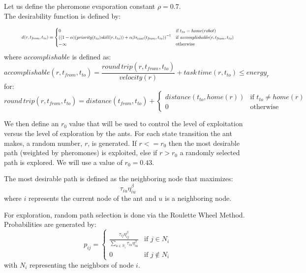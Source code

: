 \documentclass[a4paper]{article}
\begin{document}
Let us define the pheromone evaporation constant $\rho=0.7$.\\
The desirability function is defined by:

\begin{equation*}
\resizebox{0.9\textwidth}{!}{$
\mathit{d}(r, t_\mathit{from}, t_\mathit{to}) = \begin{cases}
  0 & \text{if } t_\mathit{to} = \mathit{home}(robot) \\
  \left(
  (1 - \alpha)
    (\mathit{priority}(t_\mathit{to}) \mathit{skill}(r, t_\mathit{to})) +
    \alpha \beta
    \mathit{e}_{cost}(t_\mathit{from}, t_\mathit{to})
  \right)^{-1}
  & \text{if }\mathit{accomplishable}(r, t_\mathit{from}, t_\mathit{to}) \\
  - \infty
  & \text{otherwise} \\
\end{cases}
$}
\end{equation*}
where $\mathit{accomplishable}$ is defined as:
$$
\mathit{accomplishable}(r, t_\mathit{from}, t_\mathit{to}) =
\frac{\mathit{round\,trip}(r, t_\mathit{from}, t_\mathit{to})}{velocity(r)} + \mathit{task \, time}(r, t_\mathit{to}) \leq \mathit{energy}_r
$$
for:
$$
\mathit{round\,trip}(r, t_\mathit{from}, t_\mathit{to}) = \mathit{distance}(t_\mathit{from}, t_\mathit{to}) + \begin{cases}
\mathit{distance}(t_\mathit{to}, \mathit{home}(r)) & \text{if } t_\mathit{to} \ne \mathit{home}(r) \\
0 & \text{otherwise}
\end{cases}
$$

We then define an $r_0$ value that will be used to control the level of exploitation versus the level of exploration by the ants.
For each state transition the ant makes, a random number, $r$, is generated.
If $r<=r_0$ then the most desirable path (weighted by pheromones) is exploited, else if $r>r_0$
a randomly selected path is explored. We will use a value of $r_0=0.43$.

The most desirable path is defined as the neighboring node that maximizes:
$$
\tau_{iu}\eta_{iu}^\beta
$$
where $i$ represents the current node of the ant and $u$ is a neighboring node.

For exploration, random path selection is done via the Roulette Wheel Method.
Probabilities are generated by:
$$
p_{ij}=
\begin{cases}
\frac{\tau_{ij}\eta_{ij}^\beta}{\sum\limits_{u\in N_i} \tau_{iu}\eta_{iu}^\beta} & \text{if } j \in N_i\\
0 & \text{if } j \not\in N_i
\end{cases}
$$
with $N_i$ representing the neighbors of node $i$.
\end{document}
